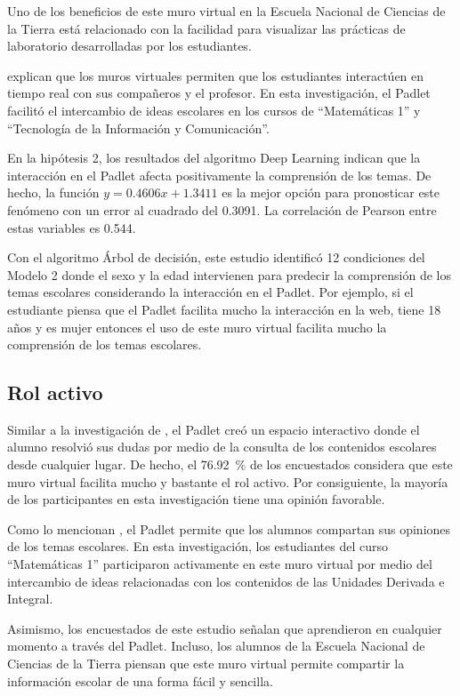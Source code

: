 \documentclass[spanish]{textolivre}
\begin{document}
Uno de los beneficios de este muro virtual en la Escuela Nacional de Ciencias de la Tierra está relacionado con la facilidad para visualizar las prácticas de laboratorio desarrolladas por los estudiantes.

\textcite{lomos2023} explican que los muros virtuales permiten que los estudiantes interactúen en tiempo real con sus compañeros y el profesor. En esta investigación, el Padlet facilitó el intercambio de ideas escolares en los cursos de “Matemáticas 1” y “Tecnología de la Información y Comunicación”.

En la hipótesis 2, los resultados del algoritmo Deep Learning indican que la interacción en el Padlet afecta positivamente la comprensión de los temas. De hecho, la función $y = 0.4606x + 1.3411$ es la mejor opción para pronosticar este fenómeno con un error al cuadrado del 0.3091. La correlación de Pearson entre estas variables es 0.544.

Con el algoritmo Árbol de decisión, este estudio identificó 12 condiciones del Modelo 2 donde el sexo y la edad intervienen para predecir la comprensión de los temas escolares considerando la interacción en el Padlet. Por ejemplo, si el estudiante piensa que el Padlet facilita mucho la interacción en la web, tiene 18 años y es mujer entonces el uso de este muro virtual facilita mucho la comprensión de los temas escolares.

\subsection{Rol activo}\label{sec-listas}
Similar a la investigación de \textcite{siantuba2023}, el Padlet creó un espacio interactivo donde el alumno resolvió sus dudas por medio de la consulta de los contenidos escolares desde cualquier lugar. De hecho, el 76.92~\% de los encuestados considera que este muro virtual facilita mucho y bastante el rol activo. Por consiguiente, la mayoría de los participantes en esta investigación tiene una opinión favorable.

Como lo mencionan \textcite{siantuba2023}, el Padlet permite que los alumnos compartan sus opiniones de los temas escolares. En esta investigación, los estudiantes del curso “Matemáticas 1” participaron activamente en este muro virtual por medio del intercambio de ideas relacionadas con los contenidos de las Unidades Derivada e Integral.

Asimismo, los encuestados de este estudio señalan que aprendieron en cualquier momento a través del Padlet. Incluso, los alumnos de la Escuela Nacional de Ciencias de la Tierra piensan que este muro virtual permite compartir la información escolar de una forma fácil y sencilla.
\end{document}
